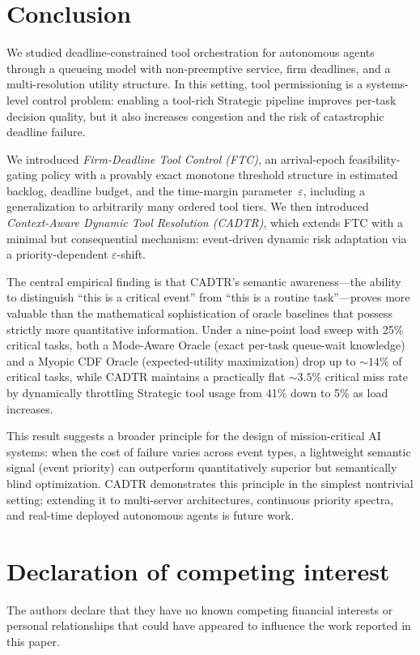 \documentclass[preprint,12pt]{elsarticle}
\begin{document}
\section{Conclusion}
\label{conclusion}
We studied deadline-constrained tool orchestration for autonomous agents through a queueing model with non-preemptive service, firm deadlines, and a multi-resolution utility structure. In this setting, tool permissioning is a systems-level control problem: enabling a tool-rich Strategic pipeline improves per-task decision quality, but it also increases congestion and the risk of catastrophic deadline failure.

We introduced \emph{Firm-Deadline Tool Control (FTC)}, an arrival-epoch feasibility-gating policy with a provably exact monotone threshold structure in estimated backlog, deadline budget, and the time-margin parameter~$\varepsilon$, including a generalization to arbitrarily many ordered tool tiers. We then introduced \emph{Context-Aware Dynamic Tool Resolution (CADTR)}, which extends FTC with a minimal but consequential mechanism: event-driven dynamic risk adaptation via a priority-dependent $\varepsilon$-shift.

The central empirical finding is that CADTR's semantic awareness---the ability to distinguish ``this is a critical event'' from ``this is a routine task''---proves more valuable than the mathematical sophistication of oracle baselines that possess strictly more quantitative information. Under a nine-point load sweep with 25\% critical tasks, both a Mode-Aware Oracle (exact per-task queue-wait knowledge) and a Myopic CDF Oracle (expected-utility maximization) drop up to ${\sim}14\%$ of critical tasks, while CADTR maintains a practically flat ${\sim}3.5\%$ critical miss rate by dynamically throttling Strategic tool usage from 41\% down to 5\% as load increases.

This result suggests a broader principle for the design of mission-critical AI systems: when the cost of failure varies across event types, a lightweight semantic signal (event priority) can outperform quantitatively superior but semantically blind optimization. CADTR demonstrates this principle in the simplest nontrivial setting; extending it to multi-server architectures, continuous priority spectra, and real-time deployed autonomous agents is future work.

\section*{Declaration of competing interest}
The authors declare that they have no known competing financial interests or personal relationships that could have appeared to influence the work reported in this paper.
\end{document}
